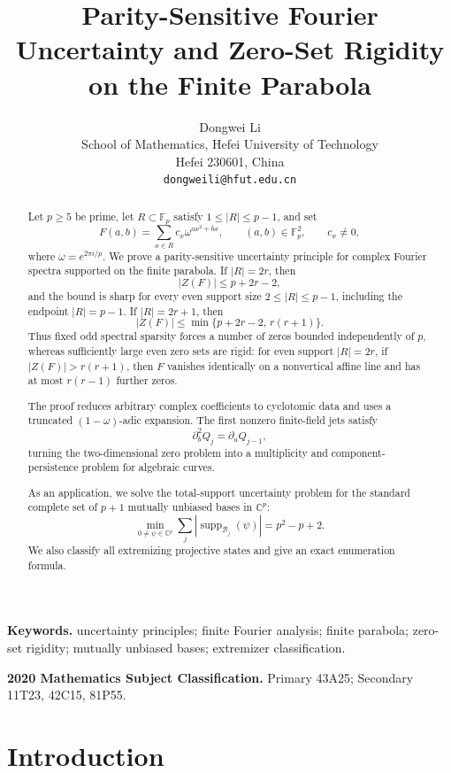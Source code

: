 \documentclass[11pt]{article}
\title{Parity-Sensitive Fourier Uncertainty and Zero-Set Rigidity\\on the Finite Parabola}
\author{Dongwei Li\\
School of Mathematics, Hefei University of Technology\\
Hefei 230601, China\\
\texttt{dongweili@hfut.edu.cn}}
\date{}
\begin{document}
\maketitle

\begin{abstract}
Let $p\ge5$ be prime, let $R\subset\mathbb F_p$ satisfy
$1\le |R|\le p-1$, and set
\[
 F(a,b)=\sum_{x\in R}c_x\omega^{ax^2+bx},
 \qquad (a,b)\in\mathbb F_p^2,
 \qquad c_x\ne0,
\]
where $\omega=e^{2\pi i/p}$.  We prove a parity-sensitive uncertainty principle for complex Fourier spectra
supported on the finite parabola.
If $|R|=2r$, then
\[
 |Z(F)|\le p+2r-2,
\]
and the bound is sharp for every even support size $2\le |R|\le p-1$, including the endpoint $|R|=p-1$.  If $|R|=2r+1$, then
\[
 |Z(F)|\le \min\{p+2r-2,\,r(r+1)\}.
\]
Thus fixed odd spectral sparsity forces a number of zeros bounded
independently of $p$, whereas sufficiently large even zero sets are rigid:
for even support $|R|=2r$, if $|Z(F)|>r(r+1)$, then $F$ vanishes
identically on a nonvertical affine line and has at most $r(r-1)$ further
zeros.

The proof reduces arbitrary complex coefficients to cyclotomic data and
uses a truncated $(1-\omega)$-adic expansion.  The first nonzero finite-field
jets satisfy
\[
 \partial_b^2Q_j=\partial_aQ_{j-1},
\]
turning the two-dimensional zero problem into a multiplicity and
component-persistence problem for algebraic curves.

As an application, we solve the total-support uncertainty problem for the
standard complete set of $p+1$ mutually unbiased bases in $\mathbb C^p$:
\[
 \min_{0\ne\psi\in\mathbb C^p}
 \sum_j |\operatorname{supp}_{\mathcal B_j}(\psi)|
 =p^2-p+2.
\]
We also classify all extremizing projective states and give an exact
enumeration formula.
\end{abstract}

\medskip
\noindent\textbf{Keywords.}
uncertainty principles; finite Fourier analysis; finite parabola; zero-set rigidity;
mutually unbiased bases; extremizer classification.

\medskip
\noindent\textbf{2020 Mathematics Subject Classification.}
Primary 43A25; Secondary 11T23, 42C15, 81P55.

\section{Introduction}
\label{sec:introduction}
\end{document}
